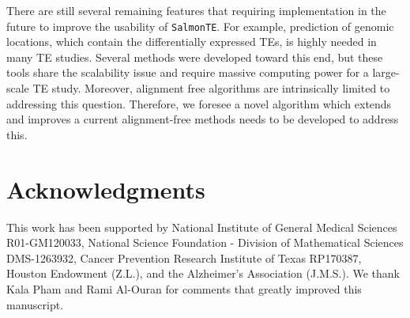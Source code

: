 \documentclass[wsdraft]{ws-procs11x85}
\newcommand{\SalmonTE}{\texttt{SalmonTE}}
\begin{document}
There are still several remaining features that requiring implementation in the future to improve the usability of \SalmonTE. 
% 
% 
For example, prediction of genomic locations, which 
% 
% 
% 
%
contain the differentially expressed TEs, is highly needed in many TE studies. Several methods were developed toward this end\cite{de2017identifying,criscione2014transcriptional}, but these tools share the scalability issue and require
% 
% 
% 
%
massive computing power for a large-scale TE study. 
Moreover, alignment free algorithms are intrinsically limited to addressing this 
% 
% 
% 
%
question. 
Therefore, we foresee a novel algorithm which extends and improves a current alignment-free methods needs to be developed to address this.
% 
% 
% 
% 

\section*{Acknowledgments}
This work has been supported by National Institute of General Medical Sciences R01-GM120033, National Science Foundation - Division of Mathematical Sciences DMS-1263932, Cancer Prevention Research Institute of Texas RP170387, Houston Endowment (Z.L.), and the Alzheimer's Association (J.M.S.). 
We thank Kala Pham and Rami Al-Ouran for comments that greatly improved this manuscript.




\end{document}
